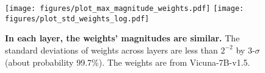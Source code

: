 \begin{figure}[t]
    \centering
    \texttt{[image: figures/plot\_max\_magnitude\_weights.pdf]}
    \vspace{-10pt}
    \texttt{[image: figures/plot\_std\_weights\_log.pdf]}
    \caption{\textbf{In each layer, the weights' magnitudes are similar.} The standard deviations of weights across layers are less than $2^{-2}$ by 3-$\sigma$ (about probability 99.7\%). The weights are from Vicuna-7B-v1.5.}
    \label{fig:weights_std}
\end{figure}